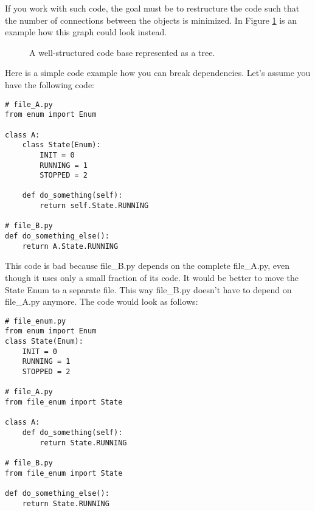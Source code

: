 If you work with such code, the goal must be to restructure the code such that the number of connections between the objects is minimized. In Figure \ref{fig:well_structured_code} is an example how this graph could look instead.

\begin{figure}[h]
    \centering
    \caption{A well-structured code base represented as a tree.}
    \label{fig:well_structured_code}
\end{figure}

Here is a simple code example how you can break dependencies. Let's assume you have the following code:

\begin{programcode}{}   
\begin{verbatim}
# file_A.py
from enum import Enum

class A:
    class State(Enum):
        INIT = 0
        RUNNING = 1
        STOPPED = 2

    def do_something(self):
        return self.State.RUNNING

# file_B.py
def do_something_else():
    return A.State.RUNNING
\end{verbatim}
\end{programcode}

This code is bad because file\_B.py depends on the complete file\_A.py, even though it uses only a small fraction of its code. It would be better to move the State Enum to a separate file. This way file\_B.py doesn't have to depend on file\_A.py anymore. The code would look as follows:

\begin{programcode}{}
\begin{verbatim}
# file_enum.py
from enum import Enum
class State(Enum):
    INIT = 0
    RUNNING = 1
    STOPPED = 2 

# file_A.py
from file_enum import State

class A:
    def do_something(self):
        return State.RUNNING

# file_B.py
from file_enum import State

def do_something_else():
    return State.RUNNING

\end{verbatim}
\end{programcode}

